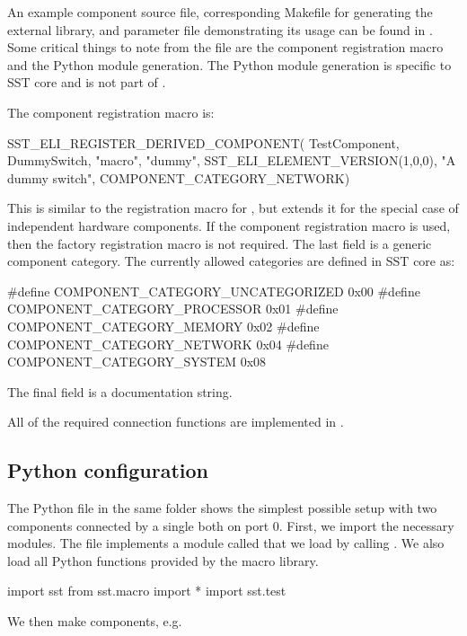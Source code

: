 An example component source file, corresponding Makefile for generating the external library, and parameter file demonstrating its usage can be found in .
Some critical things to note from the file  are the component registration macro and the Python module generation.
The Python module generation is specific to SST core and is not part of \sstmacro.

The component registration macro is:

\begin{CppCode}
  SST_ELI_REGISTER_DERIVED_COMPONENT(
    TestComponent,
    DummySwitch,
    "macro",
    "dummy",
    SST_ELI_ELEMENT_VERSION(1,0,0),
    "A dummy switch",
    COMPONENT_CATEGORY_NETWORK)
\end{CppCode}
This is similar to the registration macro for , but extends it for the special case of independent hardware components.
If the component registration macro is used, then the factory registration macro is not required.
The last field is a generic component category.
The currently allowed categories are defined in SST core as:

\begin{CppCode}
#define COMPONENT_CATEGORY_UNCATEGORIZED  0x00
#define COMPONENT_CATEGORY_PROCESSOR      0x01
#define COMPONENT_CATEGORY_MEMORY         0x02
#define COMPONENT_CATEGORY_NETWORK        0x04
#define COMPONENT_CATEGORY_SYSTEM         0x08
\end{CppCode}
The final field is a documentation string.

All of the required connection functions are implemented in .

\subsection{Python configuration}
\label{subsec:pythonConfig}

The Python file  in the same folder shows the simplest possible setup with two components connected by a single both on port 0.
First, we import the necessary modules. The file  implements a module called  that we load by calling .
We also load all Python functions provided by the macro library.

\begin{CppCode}
import sst
from sst.macro import *
import sst.test
\end{CppCode}
We then make components, e.g.

